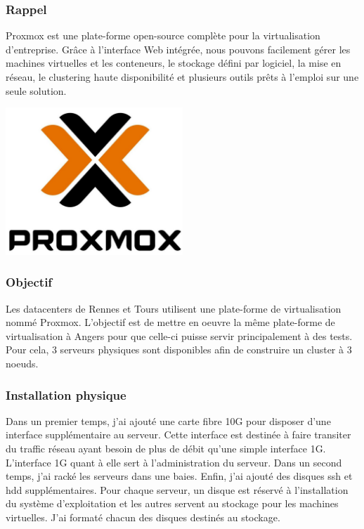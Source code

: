 \documentclass[12pt]{article}
\begin{document}
\subsubsection{Rappel}
\noindent%
\begin{minipage}{.7\textwidth}%
Proxmox est une plate-forme open-source complète pour la virtualisation d'entreprise. 
Grâce à l'interface Web intégrée, nous pouvons facilement gérer les machines virtuelles et les conteneurs, le stockage défini par logiciel, la mise en réseau, le clustering haute disponibilité et plusieurs outils prêts à l'emploi sur une seule solution.

\end{minipage}%
\hfill
\begin{minipage}{.3\textwidth}%
\begin{center}
\includegraphics[width=0.5\textwidth]{src/logo_proxmox.jpg}
\end{center}
\end{minipage}%


\subsubsection{Objectif}
Les datacenters de Rennes et Tours utilisent une plate-forme de virtualisation nommé Proxmox. 
L'objectif est de mettre en oeuvre la même plate-forme de virtualisation à Angers pour que celle-ci puisse servir principalement à des tests. 
Pour cela, 3 serveurs physiques sont disponibles afin de construire un cluster à 3 noeuds.

\subsubsection{Installation physique}
Dans un premier temps, j'ai ajouté une carte fibre 10G pour disposer d'une interface supplémentaire au serveur. 
Cette interface est destinée à faire transiter du traffic réseau ayant besoin de plus de débit qu'une simple interface 1G. 
L'interface 1G quant à elle sert à l'administration du serveur.
Dans un second temps, j'ai racké les serveurs dans une baies. 
Enfin, j'ai ajouté des disques ssh et hdd supplémentaires.
Pour chaque serveur, un disque est réservé à l'installation du système d'exploitation et les autres servent au stockage pour les machines virtuelles.
J'ai formaté chacun des disques destinés au stockage.
\end{document}
